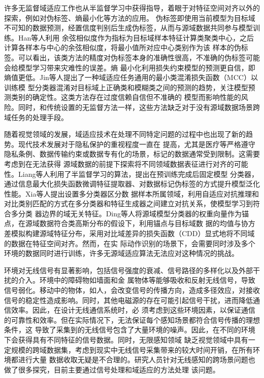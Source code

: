 许多无监督域适应工作也从半监督学习中获得指导，着眼于对特征空间对齐以外的探索，例如对伪标签、熵最小化等方法的应用。
伪标签即使用当前模型为目标域不可知的数据预测，经置信度判别后生成伪标签，从而与源域数据共同参与模型训练。Han等人\cite{han2019deep}利用
余弦相似度作为指标为目标域样本特征计算类聚类中心，之后计算各样本与中心的余弦相似度，将最小值所对应中心类别作为该
样本的伪标签。可以看出，该类方法的精度对伪标签本身的准确性很高，不准确的伪标签可能会给模型学习带来灾难性的误差。熵
最小化利用损失约束模型的预测更自信，即熵值更低。Jin等人\cite{jin2020minimum}提出了一种域适应任务通用的最小类混淆损失函数（MCC）以训练模
型分类器混淆对目标域上正确类和模糊类之间的预测的趋势，关注模型预测类别的确定性。这类方法存在过度信赖自信但不准确的
模型而影响性能的风险。同时，和传统设置的无监督方法一样，这些方法缺乏对于没有源域数据场景跨域任务的处理手段。

随着视觉领域的发展，域适应技术在处理不同特定问题的过程中也出现了新的趋势。现代技术发展对于隐私保护的重视程度一直在
提高，尤其是医疗等严格遵守隐私条例、数据传输约束或数据专有化的场景，标记的数据通常受到限制。这需要考虑到在无法获得
源域数据的前提下探索将不同领域数据表征进行对齐的可能性。Liang等人\cite{liang2020we}利用了半监督学习的算法，提出在预训练完成后固定模型
分类器，通过信息最大化损失函数微调特征提取器、对数据标记伪标签的方式提升模型泛化性能。Xia等人\cite{xia2021adaptive}提出设置多分类器区分数
据样本所属领域，利用自适应对抗推理和对比类别匹配的方式在多分类器和特征生成器之间建立对抗关系，使模型学习到符合多分类
器边界的域无关特征。Ding等人\cite{ding2022source}将源域模型分类器的权重向量作为锚点，在源域数据符合类高斯分布的假设下，利用锚点与目标域数
据的均值与协方差模拟构建源域特征分布，采用对比域差异的损失函数（CDD）显式地将不同域的数据在特征空间对齐。然而，在实
际动作识别的场景下，会需要同时涉及多个环境的数据同时进行训练，许多无源域适应算法无法应对这种情况的挑战。


环境对无线信号有显著影响，包括信号强度的衰减、信号路径的多样化以及外部干扰的介入。环境中的障碍物如墙面和金
属物体等能够吸收和反射无线信号，导致信号弱化。移动中的物体，如人，会改变信号的传播方向，造成多径效应，对接收
信号的稳定性造成影响。同时，其他电磁源的存在可能引起信号干扰，进而降低通信效率。因此，在设计无线通信系统时，必
须考虑到这些环境因素，以保证通信的可靠性和效率。但在实际情况下，无法保证每个感知场景都符合信号传播的理想条件，这
导致了采集到的无线信号包含了大量环境的噪声。因此，在不同的环境下会获得具有不同特征的信号数据。同时，无限感知领域
缺乏视觉领域中具有一定规模的跨域数据集\cite{venkateswara2017deep,sakaridis2019guided,sakaridis2021acdc}，考虑到现实中无线信号采集带来的较大时间开销，在所有环境都进行大量
数据收取无疑是不合理的。研究人员针对无线感知的跨场景问题也做了很多探究，目前主要通过信号处理和域适应的方法处理
该问题。

